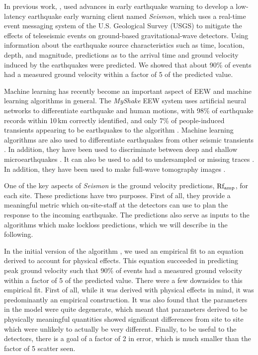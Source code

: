 \documentclass[preprint, aps, showpacs]{revtex4-1}
\begin{document}
In previous work, \cite{CoEa2017}, used advances in early earthquake warning to develop a low-latency earthquake early warning client named \emph{Seismon}, which uses a real-time event messaging system of the U.S. Geological Survey (USGS) to mitigate the effects of teleseismic events on ground-based gravitational-wave detectors. 
Using information about the earthquake source characteristics such as time, location, depth, and magnitude, predictions as to the arrival time and ground velocity induced by the earthquakes were predicted.
We showed that about 90\% of events had a measured ground velocity within a factor of 5 of the predicted value.

Machine learning has recently become an important aspect of EEW and machine learning algorithms in general.
The \emph{MyShake} EEW system uses artificial neural networks to differentiate earthquake and human motions, with 98\% of earthquake records within 10\,km correctly identified, and only 7\% of people-induced transients appearing to be earthquakes to the algorithm  \cite{KoAl2016}.
Machine learning algorithms are also used to differentiate earthquakes from other seismic transients \cite{KuYi2011,KoUs2016,PeGh2017}.
In addition, they have been used to discriminate between deep and shallow microearthquakes \cite{MoHo2016}.
It can also be used to add to undersampled or missing traces \cite{JiMa2017}.
In addition, they have been used to make full-wave tomography images \cite{DiLe2011}.

One of the key aspects of \emph{Seismon} is the ground velocity predictions, $\rm Rf_{amp}$, for each site. These predictions have two purposes. 
First of all, they provide a meaningful metric which on-site-staff at the detectors can use to plan the response to the incoming earthquake. 
The predictions also serve as inputs to the algorithms which make lockloss predictions, which we will describe in the following.

In the initial version of the algorithm \cite{CoEa2017}, we used an empirical fit to an equation derived to account for physical effects. This equation succeeded in predicting peak ground velocity such that 90\% of events had a measured ground velocity within a factor of 5 of the predicted value.
There were a few downsides to this empirical fit.
First of all, while it was derived with physical effects in mind, it was predominantly an empirical construction.
It was also found that the parameters in the model were quite degenerate, which meant that parameters derived to be physically meaningful quantities showed significant differences from site to site which were unlikely to actually be very different.
Finally, to be useful to the detectors, there is a goal of a factor of 2 in error, which is much smaller than the factor of 5 scatter seen.
\end{document}

